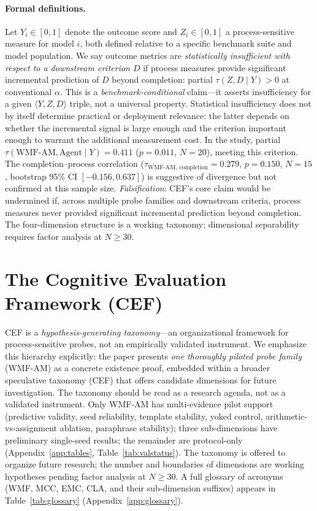 \documentclass{article}
\begin{document}
\paragraph{Formal definitions.}
Let $Y_i \in [0,1]$ denote the outcome score and $Z_i \in [0,1]$ a
process-sensitive measure for model $i$, both defined relative to a
specific benchmark suite and model population. We say outcome metrics
are \emph{statistically insufficient with respect to a downstream criterion $D$} if
process measures provide significant incremental prediction of $D$
beyond completion: partial $\tau(Z, D \mid Y) > 0$ at conventional
$\alpha$. This is a \emph{benchmark-conditional} claim---it asserts
insufficiency for a given $\langle Y, Z, D \rangle$ triple, not a
universal property. Statistical insufficiency does not by itself
determine practical or deployment relevance: the latter depends on
whether the incremental signal is large enough and the criterion
important enough to warrant the additional measurement cost.
In the study, partial $\tau(\text{WMF-AM},
\text{Agent} \mid Y) = 0.411$ ($p = 0.011$, $N{=}20$), meeting this
criterion. The completion--process correlation ($\tau_{\text{WMF-AM, completion}}{=}0.279$,
$p{=}0.150$, $N{=}15$, bootstrap 95\% CI $[-0.156, 0.637]$) is
suggestive of divergence but not confirmed at this sample size.
\emph{Falsification}: CEF's core claim would be undermined if, across
multiple probe families and downstream criteria, process measures
never provided significant incremental prediction beyond completion.
The four-dimension structure is a working taxonomy;
dimensional separability requires factor analysis at $N \geq 30$.


\section{The Cognitive Evaluation Framework (CEF)}
\label{sec:cef}

CEF is a \emph{hypothesis-generating taxonomy}---an organizational
framework for process-sensitive probes, not an empirically validated
instrument. We emphasize this hierarchy explicitly: the paper
presents \emph{one thoroughly piloted probe family} (WMF-AM) as a
concrete existence proof, embedded within a broader speculative
taxonomy (CEF) that offers candidate dimensions for future
investigation. The taxonomy should be read as a research agenda, not
as a validated instrument. Only WMF-AM has multi-evidence pilot support
(predictive validity, seed reliability, template stability, yoked
control, arithmetic-vs-assignment ablation, paraphrase stability);
three sub-dimensions have preliminary single-seed results; the
remainder are protocol-only (Appendix~\ref{app:tables},
Table~\ref{tab:valstatus}).
The taxonomy is offered to organize future research; the number and
boundaries of dimensions are working hypotheses pending factor analysis
at $N \geq 30$.
A full glossary of acronyms (WMF, MCC, EMC, CLA, and their
sub-dimension suffixes) appears in Table~\ref{tab:glossary}
(Appendix~\ref{app:glossary}).
\end{document}
